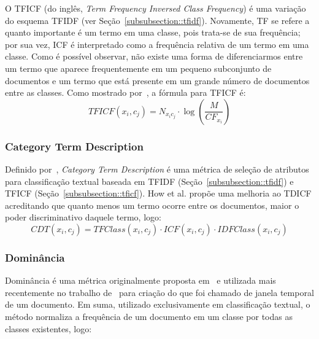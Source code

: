 O TFICF (do inglês, \textit{Term Frequency Inversed Class Frequency}) é uma variação do esquema TFIDF (ver Seção~\ref{subsubsection::tfidf}). Novamente, TF se refere a quanto importante é um termo em uma classe, pois trata-se de sua frequência; por sua vez, ICF é interpretado como a frequência relativa de um termo em uma classe. Como é possível observar, não existe uma forma de diferenciarmos entre um termo que aparece frequentemente em um pequeno subconjunto de documentos e um termo que está presente em um grande número de documentos entre as classes. Como mostrado por~\cite{ChihHow04}, a fórmula para TFICF é:
\begin{equation}\label{eqn::tficf}
   TFICF(x_i, c_j) = N_{x_ic_j} \cdot \log( \frac{M}{CF_{x_i}} )
\end{equation}

\subsubsection{Category Term Description}
\label{subsubsection::ctd}

Definido por~\cite{ChihHow04}, \textit{Category Term Description} é uma métrica de seleção de atributos para classificação textual baseada em TFIDF (Seção~\ref{subsubsection::tfidf}) e TFICF (Seção~\ref{subsubsection::tficf}). How et al. propõe uma melhoria ao TDICF acreditando que quanto menos um termo ocorre entre os documentos, maior o poder discriminativo daquele termo, logo:
\begin{equation}\label{eqn::cdt}
   CDT(x_i, c_j) = TFClass(x_i, c_j) \cdot ICF(x_i, c_j) \cdot IDFClass(x_i,c_j)
\end{equation}

\subsubsection{Dominância}
\label{subsubsection::dom}

Dominância é uma métrica originalmente proposta em~\cite{Zaiane02} e utilizada mais recentemente no trabalho de~\cite{Rocha08} para criação do que foi chamado de janela temporal de um documento. Em suma, utilizado exclusivamente em classificação textual, o método normaliza a frequência de um documento em um classe por todas as classes existentes, logo:

